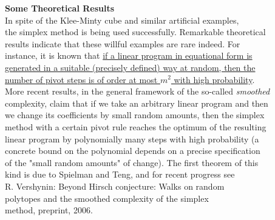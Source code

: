 \documentclass{article}%
\begin{document}
\textbf{Some Theoretical Results} \\
[MG] In spite of the Klee-Minty cube and similar artificial examples, \\
the simplex method is being used successfully. Remarkable theoretical \\
results indicate that these willful examples are rare indeed. For \\
instance, it is known that \underline{if a linear program in equational form is} \\
\underline{generated in a suitable (precisely defined) way at random, then the} \\
\underline{number of pivot steps is of order at most $m^2$ with high probability}. \\
More recent results, in the general framework of the so-called \textit{smoothed} \\
complexity, claim that if we take an arbitrary linear program and then \\
we change its coefficients by small random amounts, then the simplex \\
method with a certain pivot rule reaches the optimum of the resulting \\
linear program by polynomially many steps with high probability (a \\
concrete bound on the polynomial depends on a precise specification \\
of the "small random amounts" of change). The first theorem of this \\
kind is due to Spielman and Teng, and for recent progress see \\
R. Vershynin: Beyond Hirsch conjecture: Walks on random \\
polytopes and the smoothed complexity of the simplex \\
method, preprint, 2006.
%
\end{document}
